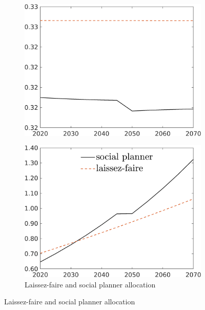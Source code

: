 \begin{figure}[h!!]
\begin{subfigure}{1\textwidth}
\begin{minipage}[]{0.32\textwidth}
\end{minipage}	
\begin{minipage}[]{0.32\textwidth}
\includegraphics[width=1\textwidth]{../../codding_model/own_basedOnFried/optimalPol_010922_revision/figures/all_13Sept22_Tplus30/hl_LFCompOPT_T_NoTaus_regime0_spillover0_noskill0_sep0_xgrowth0_PV1_etaa0.79_lgd0.png}
\end{minipage}	
	\end{subfigure}	
	\begin{subfigure}{1\textwidth}		
	\caption{Laissez-faire and social planner allocation}
	\begin{minipage}[]{0.32\textwidth}
		\includegraphics[width=1\textwidth]{../../codding_model/own_basedOnFried/optimalPol_010922_revision/figures/all_13Sept22_Tplus30/C_LFCompSP_T_regime0_spillover0_noskill0_sep0_xgrowth0_PV1_etaa0.79_lgd1.png}

\end{minipage}
\end{subfigure}
\end{figure}

